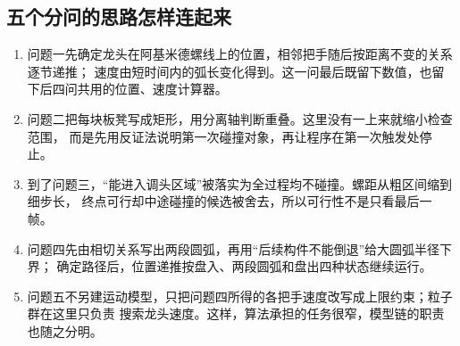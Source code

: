 \subsection{五个分问的思路怎样连起来}

\begin{enumerate}
  \item 问题一先确定龙头在阿基米德螺线上的位置，相邻把手随后按距离不变的关系逐节递推；
  速度由短时间内的弧长变化得到。这一问最后既留下数值，也留下后四问共用的位置、速度计算器。
  \item 问题二把每块板凳写成矩形，用分离轴判断重叠。这里没有一上来就缩小检查范围，
  而是先用反证法说明第一次碰撞对象，再让程序在第一次触发处停止。
  \item 到了问题三，“能进入调头区域”被落实为全过程均不碰撞。螺距从粗区间缩到细步长，
  终点可行却中途碰撞的候选被舍去，所以可行性不是只看最后一帧。
  \item 问题四先由相切关系写出两段圆弧，再用“后续构件不能倒退”给大圆弧半径下界；
  确定路径后，位置递推按盘入、两段圆弧和盘出四种状态继续运行。
  \item 问题五不另建运动模型，只把问题四所得的各把手速度改写成上限约束；粒子群在这里只负责
  搜索龙头速度。这样，算法承担的任务很窄，模型链的职责也随之分明。
\end{enumerate}

